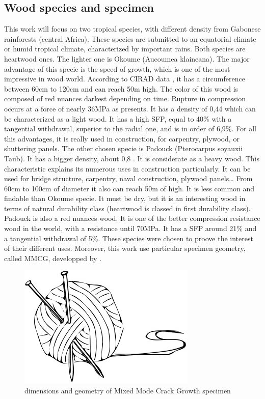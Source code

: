 \documentclass[3p,times,procedia]{elsarticle}
\begin{document}
\subsection{Wood species and specimen}\label{Ss:spec}

This work will focus on two tropical species, with different density from Gabonese rainforests (central Africa). These species are submitted to an equatorial climate or humid tropical climate, characterized by important rains. Both species are heartwood ones. The lighter one is Okoume (Aucoumea klaineana). The major advantage of this specie is the speed of growth, which is one of the most impressive in wood world. According to CIRAD data \cite{Reference5}, it has a circumference between 60cm to 120cm and can reach 50m high. The color of this wood is composed of red nuances darkest depending on time. Rupture in compression occurs at a force of nearly 36\si{\mega\pascal} as \cite{Reference5} presents. It has a density of 0,44 which can be characterized as a light wood. It has a high SFP, equal to 40\% with a tangential withdrawal, superior to the radial one, and is in order of 6,9\%. For all this advantages, it is really used in construction, for carpentry, plywood, or shuttering panels. The other chosen specie is Padouck (Pterocarpus soyauxii Taub). It has a bigger density, about 0,8 \cite{Reference7}. It is considerate as a heavy wood. This characteristic explains its numerous uses in construction particularly. It can be used for bridge structure, carpentry, naval construction, plywood panels…   From 60\si{\centi\meter} to 100\si{\centi\meter} of diameter it also can reach 50\si{\meter} of high. It is less common and findable than Okoume specie. It must be dry, but it is an interesting wood in terms of natural durability class (heartwood is classed in first durability class). Padouck is also a red nuances wood. It is one of the better compression resistance wood in the world, with a resistance until 70\si{\mega\pascal}. It has a SFP around 21\% and a tangential withdrawal of 5\%. These species were chosen to proove the interest of their different uses.
Moreover, this work use particular specimen geometry, called MMCG, developped by \cite{MOU2008}.
\begin{figure}[th]
	\centering
	\includegraphics[scale=0.5]{Figures/example}
	\caption[MMCG specimen]{dimensions and geometry of Mixed Mode Crack Growth specimen}
	\label{fig:Fig5}
\end{figure}
\end{document}
